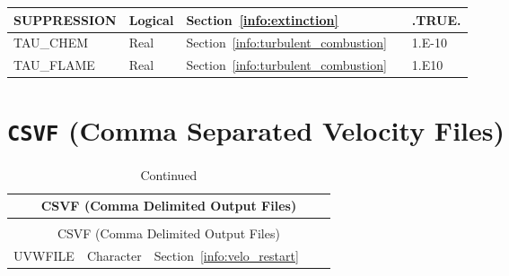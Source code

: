 \documentclass[11pt]{book}
\begin{document}
\begin{longtable}{@{\extracolsep{\fill}}|l|l|l|l|l|}
{\ct SUPPRESSION}                               & Logical       & Section~\ref{info:extinction}                         &               & {\ct .TRUE.}         \\ \hline
{\ct TAU\_CHEM}                                 & Real          & Section~\ref{info:turbulent_combustion}               &               & 1.E-10               \\ \hline
{\ct TAU\_FLAME}                                & Real          & Section~\ref{info:turbulent_combustion}               &               & 1.E10                \\ \hline
\end{longtable}

\vspace{\baselineskip}



\section{\texorpdfstring{{\tt CSVF}}{CSVF} (Comma Separated Velocity Files)}

\begin{longtable}{@{\extracolsep{\fill}}|l|l|l|l|l|}
\caption[Comma separated velocity files ({\ct CSVF} namelist group)]{For more information see Section~\ref{info:CSVF}.}
\label{tbl:CSVF} \\
\hline
\multicolumn{5}{|c|}{{\ct CSVF} (Comma Delimited Output Files)} \\
\hline \hline
\endfirsthead
\caption[]{Continued} \\
\hline
\multicolumn{5}{|c|}{{\ct CSVF} (Comma Delimited Output Files)} \\
\hline \hline
\endhead
{\ct UVWFILE}         & Character      & Section~\ref{info:velo_restart}      &            &     \\ \hline
\end{longtable}
\end{document}
